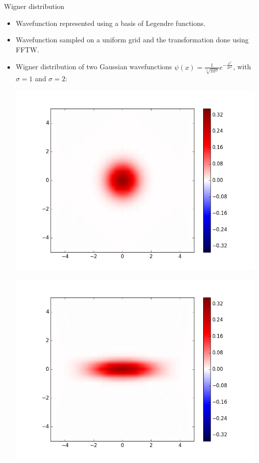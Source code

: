\documentclass{beamer}
\begin{document}
\begin{frame}{Wigner distribution}
	\begin{itemize}
		\vfill
		\item Wavefunction represented using a basis of Legendre functions.
		\vfill
		\item Wavefunction sampled on a uniform grid and the transformation done using FFTW.
		\vfill
		\item Wigner distribution of two Gaussian wavefunctions $\psi(x) = \frac{1}{\sqrt[4]{\pi\sigma^2}}e^{-\frac{x^2}{2\sigma^2}}$, with $\sigma=1$ and $\sigma=2$:\\
		\begin{minipage}[t][][b]{0.49\linewidth}
			\centering
			\vspace*{-5pt}
			\includegraphics[width=1\linewidth]{test0}
		\end{minipage}
		\begin{minipage}[t][][b]{0.49\linewidth}
			\centering
			\vspace*{-5pt}
			\includegraphics[width=1\linewidth]{test1}
		\end{minipage}
		\vfill
	\end{itemize}
\end{frame}
\end{document}
